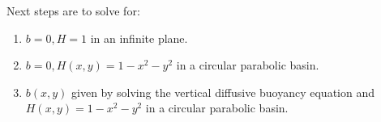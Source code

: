 \documentclass[10pt]{amsart}
\begin{document}
Next steps are to solve for:
\begin{enumerate}
\item $b=0, H=1$ in an infinite plane.
\item $b=0, H(x,y) = 1 - x^2 - y^2$ in a circular parabolic basin.
\item $b(x,y)$ given by solving the vertical diffusive buoyancy equation and $H(x,y) = 1 - x^2 - y^2$ in a circular parabolic basin.
\end{enumerate}




\end{document}
